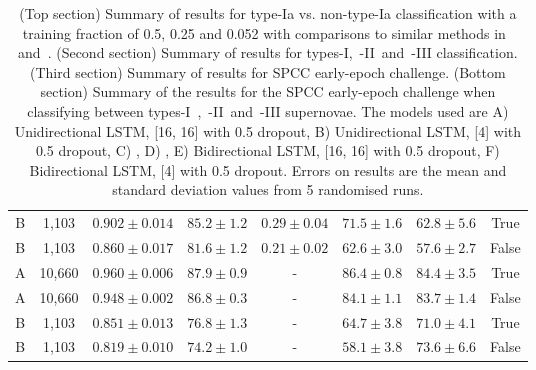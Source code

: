 \documentclass[twocolumn]{aastex61}
\begin{document}
\begin{table}[t!]
\begin{tabular}{ c  c  c  c  c  c  c  c }
B & 1,103 & $0.902 \pm 0.014$ & $85.2 \pm 1.2$ & $0.29 \pm 0.04$ & $71.5 \pm 1.6$ & $62.8 \pm 5.6$ & True\\
B & 1,103 & $0.860 \pm 0.017$ & $81.6 \pm 1.2$ & $0.21 \pm 0.02$ & $62.6 \pm 3.0$ & $57.6 \pm 2.7$ & False\\\hline\hline
A & 10,660 & $0.960 \pm 0.006$ & $87.9 \pm 0.9$ & - & $86.4 \pm 0.8$ & $84.4 \pm 3.5$ & True\\
A & 10,660 & $0.948 \pm 0.002$ & $86.8 \pm 0.3$ & - & $84.1 \pm 1.1$ & $83.7 \pm 1.4$ & False\\
B & 1,103 & $0.851 \pm 0.013$ & $76.8 \pm 1.3$ & - & $64.7 \pm 3.8$ & $71.0 \pm 4.1$ & True\\
B & 1,103 & $0.819 \pm 0.010$ & $74.2 \pm 1.0$ & - & $58.1 \pm 3.8$ & $73.6 \pm 6.6$ & False\\\hline\hline
\end{tabular}
\caption{\label{tab:05_SN1a} (Top section) Summary of results for  type-Ia vs. non-type-Ia classification with a training fraction of 0.5, 0.25 and 0.052 with comparisons to similar methods in~\cite{Karpenka:2012pm} and~\cite{Newling:2010bp}. (Second section) Summary of results for types-I,~-II~and~-III classification. (Third section) Summary of results for SPCC early-epoch challenge. (Bottom section) Summary of the results for the SPCC early-epoch challenge when classifying between types-I~,~-II~and~-III supernovae. The models used are A) Unidirectional LSTM, [16, 16] with 0.5 dropout, B) Unidirectional LSTM, [4] with 0.5 dropout, C) \cite{Karpenka:2012pm}, D) \cite{Newling:2010bp}, E) Bidirectional LSTM, [16, 16] with 0.5 dropout, F) Bidirectional LSTM, [4] with 0.5 dropout. Errors on results are the mean and standard deviation values from 5 randomised runs.}
\end{table}
\end{document}
